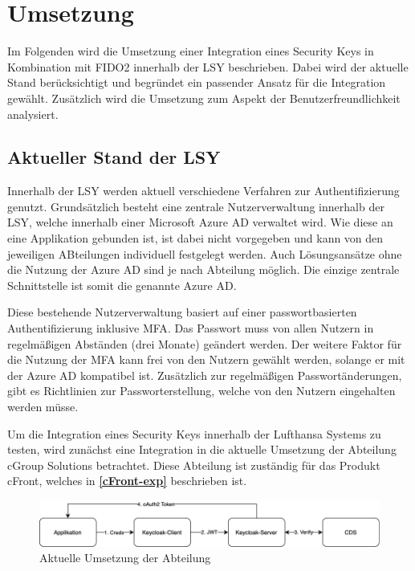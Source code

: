 \chapter{Umsetzung}

Im Folgenden wird die Umsetzung einer Integration eines Security Keys in Kombination mit \ac{FIDO}2 innerhalb der \ac{LSY} beschrieben. Dabei wird der aktuelle Stand berücksichtigt und begründet ein passender Ansatz für die Integration gewählt. Zusätzlich wird die Umsetzung zum Aspekt der Benutzerfreundlichkeit analysiert.

\section{Aktueller Stand der LSY}
Innerhalb der \ac{LSY} werden aktuell verschiedene Verfahren zur Authentifizierung genutzt. Grundsätzlich besteht eine zentrale Nutzerverwaltung innerhalb der \ac{LSY}, welche innerhalb einer Microsoft Azure \ac{AD} verwaltet wird. Wie diese an eine Applikation gebunden ist, ist dabei nicht vorgegeben und kann von den jeweiligen ABteilungen individuell festgelegt werden. Auch Lösungsansätze ohne die Nutzung der Azure \ac{AD} sind je nach Abteilung möglich. Die einzige zentrale Schnittstelle ist somit die genannte Azure \ac{AD}.

Diese bestehende Nutzerverwaltung basiert auf einer passwortbasierten Authentifizierung inklusive \ac{MFA}. Das Passwort muss von allen Nutzern in regelmäßigen Abständen (drei Monate) geändert werden. Der weitere Faktor für die Nutzung der \ac{MFA} kann frei von den Nutzern gewählt werden, solange er mit der Azure \ac{AD} kompatibel ist. Zusätzlich zur regelmäßigen Passwortänderungen, gibt es Richtlinien zur Passworterstellung, welche von den Nutzern eingehalten werden müsse. 


Um die Integration eines Security Keys innerhalb der Lufthansa Systems zu testen, wird zunächst eine Integration in die aktuelle Umsetzung der Abteilung cGroup Solutions betrachtet. Diese Abteilung ist zuständig für das Produkt cFront, welches in \textbf{\ref{cFront-exp}} beschrieben ist. 
\begin{figure}[h]
	\centering 
	\includegraphics[width=1\textwidth]{img/abbildungen/Unknown.png}
	\captionsetup{format=hang}
	\caption{Aktuelle Umsetzung der Abteilung}
\end{figure}

